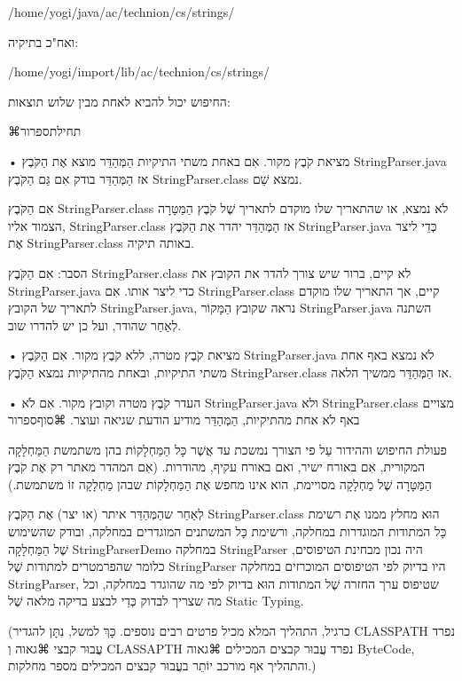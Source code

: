 /home/yogi/java/ac/technion/cs/strings/

ואח"כ בתיקיה:

/home/yogi/import/lib/ac/technion/cs/strings/

החיפוש יכול להביא לאחת מבין שלוש תוצאות:

⌘תחילת{ספרור}

•  מציאת קֹבֶץ מקור. אִם באחת משתי התיקיות הַמְּהַדֵּר מוצא אֶת הַקֹּבֶץ
StringParser.java אז הַמְּהַדֵּר בודק אִם גַּם הַקֹּבֶץ StringParser.class נמצא
שֵׁם.

אִם הַקֹּבֶץ StringParser.class לֹא נמצא, או שהתאריך שלו מוקדם לתאריך שֶׁל קֹבֶץ
הַמַּטָּרָה הצמוד אליו, StringParser.class אז הַמְּהַדֵּר יהדר אֶת הַקֹּבֶץ
StringParser.java כְּדֵי ליצר אֶת StringParser.class באותה תיקיה.

הסבר: אִם הַקֹּבֶץ StringParser.class לא קיים, ברור שיש צורך להדר את הקובץ את
StringParser.java כדי ליצר אותו. אִם StringParser.class קיים, אך התאריך שלו
מוקדם לתאריך של הקובץ StringParser.java, נראה שקובץ הַמָּקוֹר StringParser.java
השתנה לְאַחַר שהודר, ועל כן יש להדרו שוב.

•  מציאת קֹבֶץ מטרה, ללא קֹבֶץ מקור. אִם הַקֹּבֶץ StringParser.java לֹא נמצא באף
אחת משתי התיקיות, ובאחת מהתיקיות נמצא הַקֹּבֶץ StringParser.class אז הַמְּהַדֵּר
ממשיך הלאה.

•  העדר קֹבֶץ מטרה וקובץ מקור. אִם לֹא StringParser.java ולא StringParser.class
מצויים באף לֹא אחת מהתיקיות, הַמְּהַדֵּר מודיע הודעת שגיאה ועוצר.
⌘סוף{ספרור}

פעולת החיפוש וההידור עַל פי הצורך נמשכת עד אֲשֶׁר כָּל הַמַּחְלָקוֹת בהן משתמשת
הַמַּחְלָקָה המקורית, אִם באורח ישיר, ואם באורח עקיף, מהודרות. (אִם המהדר מאתר
רק אֶת קֹבֶץ הַמַּטָּרָה שֶׁל מַחְלָקָה מסויימת, הוא אינו מחפש אֶת הַמַּחְלָקוֹת
שבהן מַחְלָקָה זוֹ משתמשת.)

לְאַחַר שהַמְּהַדֵּר איתר (או יצר) אֶת הַקֹּבֶץ StringParser.class הוּא מחלץ
ממנו אֶת רשימת כָּל המתודות המוגדרות במחלקה, ורשימת כָּל המשתנים המוגדרים
במחלקה, ובודק שהשימוש שֶׁל הַמַּחְלָקָה StringParserDemo במחלקה StringParser היה
נכון מבחינת הטיפוסים, כלומר שהפרמטרים למתודות שֶׁל StringParser היו בדיוק לפי
הטיפוסים המוכרזים במחלקה StringParser, שטיפוס ערך החזרה שֶׁל המתודות הוּא בדיוק
לפי מה שהוגדר במחלקה, וכל מה שצריך לבדוק כְּדֵי לבצע בדיקה מלאה שֶׁל Static
Typing.

(כרגיל, התהליך המלא מכיל פרטים רבים נוספים. כָּךְ למשל, נִתָּן להגדיר CLASSPATH
נפרד עֲבוּר קבצי ⌘גאוה וְ CLASSAPTH נפרד עֲבוּר קבצים המכילים ⌘גאוה ByteCode,
והתהליך אף מורכב יוֹתֵר בעֲבוּר קבצים המכילים מספר מחלקות.)

